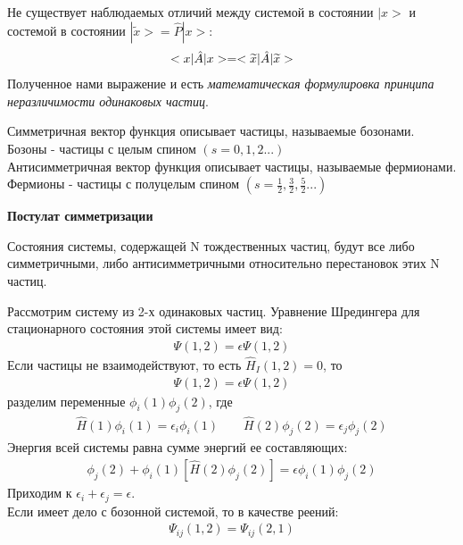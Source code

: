 \documentclass[__main__.tex]{subfiles}
\begin{document}
Не существует наблюдаемых отличий между системой в состоянии $|x>$ и состемой в состоянии $|\widetilde{x}> = \hat{P}|x>$:
\begin{gather}
\llabel{ch02:1}
<x|\hat{A}|x> = <\widetilde{x}|\hat{A}|\widetilde{x}>
\end{gather}
Полученное нами выражение  и есть \textit{математическая формулировка принципа неразличимости одинаковых частиц}.
\begin{definition}
Симметричная вектор функция описывает частицы, называемые бозонами.\\
Бозоны - частицы с целым спином $(s = 0,1,2...)$\\
Антисимметричная вектор функция описывает частицы, называемые фермионами.\\
Фермионы - частицы с полуцелым спином $(s = \frac{1}{2},\frac{3}{2},\frac{5}{2}...)$\\
\end{definition}
\textbf{Постулат симметризации}
\begin{definition}
Состояния системы, содержащей N тождественных частиц, будут все либо симметричными, либо антисимметричными относительно перестановок этих N частиц.\\
\end{definition}
Рассмотрим систему из 2-х одинаковых частиц. Уравнение Шредингера для стационарного состояния этой системы имеет вид:\\
\begin{gather}
[\hat{H}(1)+\hat{H}(2)+\hat{H}_I(1,2)]\Psi(1,2) = \epsilon \Psi(1,2)
\end{gather}
Если частицы не взаимодействуют, то есть $\hat{H}_I(1,2) = 0$, то
\begin{gather}
[\hat{H}(1)+\hat{H}(2)]\Psi(1,2) = \epsilon \Psi(1,2)
\end{gather}
разделим переменные $\phi_i(1)\phi_j(2)$, где 
\begin{gather}
\hat{H}(1)\phi_i(1)=\epsilon_i\phi_i(1) \qquad \hat{H}(2)\phi_j(2)=\epsilon_j\phi_j(2)
\end{gather}
Энергия всей системы равна сумме энергий ее составляющих:
\begin{gather}
[\hat{H}(1)\phi_i(1)]\phi_j(2)+\phi_i(1)[\hat{H}(2)\phi_j(2)]=\epsilon\phi_i(1)\phi_j(2)
\end{gather}
Приходим к $\epsilon_i+\epsilon_j=\epsilon$.\\
Если имеет дело с бозонной системой, то в качестве реений:\\
\begin{gather}
\Psi_{ij}(1,2) = \Psi_{ij}(2,1)
\end{gather}
\end{document}
